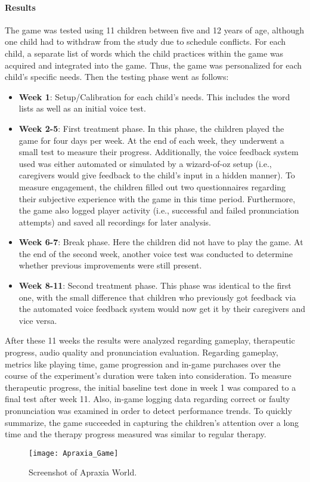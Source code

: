 \documentclass[draft,final]{vutinfth} %
\begin{document}
\paragraph{Results} 
The game was tested using 11 children between five and 12 years of age, although one child had to withdraw from the study due to schedule conflicts. For each child, a separate list of words which the child practices within the game was acquired and integrated into the game. Thus, the game was personalized for each child's specific needs. Then the testing phase went as follows: 
\begin{itemize}
\item \textbf{Week 1}: Setup/Calibration for each child's needs. This includes the word lists as well as an initial voice test.
\item \textbf{Week 2-5}: First treatment phase. In this phase, the children played the game for four days per week. At the end of each week, they underwent a small test to measure their progress. Additionally, the voice feedback system used was either automated or simulated by a wizard-of-oz setup (i.e., caregivers would give feedback to the child's input in a hidden manner). To measure engagement, the children filled out two questionnaires regarding their subjective experience with the game in this time period. Furthermore, the game also logged player activity (i.e., successful and failed pronunciation attempts) and saved all recordings for later analysis.
\item \textbf{Week 6-7}: Break phase. Here the children did not have to play the game. At the end of the second week, another voice test was conducted to determine whether previous improvements were still present.
\item \textbf{Week 8-11}: Second treatment phase. This phase was identical to the first one, with the small difference that children who previously got feedback via the automated voice feedback system would now get it by their caregivers and vice versa.

 
\end{itemize} 
After these 11 weeks the results were analyzed regarding gameplay, therapeutic progress, audio quality and pronunciation evaluation. Regarding gameplay, metrics like playing time, game progression and in-game purchases over the course of the experiment's duration were taken into consideration. To measure therapeutic progress, the initial baseline test done in week 1 was compared to a final test after week 11. Also, in-game logging data regarding correct or faulty pronunciation was examined in order to detect performance trends.
To quickly summarize, the game succeeded in capturing the children's attention over a long time and the therapy progress measured was similar to regular therapy.
\begin{figure}
\begin{center}
\texttt{[image: Apraxia\_Game]}
\end{center}
\caption{Screenshot of Apraxia World\cite{hair2021longitudinal}.}
\end{figure}
\end{document}

